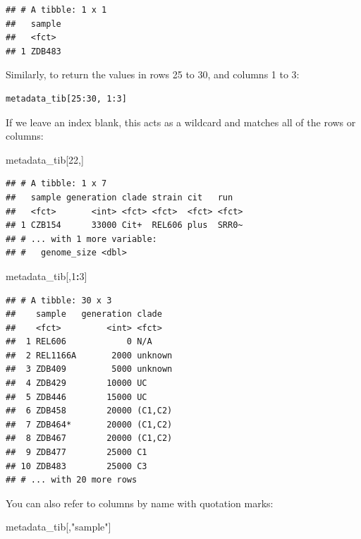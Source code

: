 \documentclass[]{book}
\newenvironment{Shaded}{\begin{snugshade}}{\end{snugshade}}
\newcommand{\DecValTok}[1]{\textcolor[rgb]{0.00,0.00,0.81}{#1}}
\newcommand{\NormalTok}[1]{#1}
\newcommand{\OperatorTok}[1]{\textcolor[rgb]{0.81,0.36,0.00}{\textbf{#1}}}
\newcommand{\StringTok}[1]{\textcolor[rgb]{0.31,0.60,0.02}{#1}}
\begin{document}
\begin{verbatim}
## # A tibble: 1 x 1
##   sample
##   <fct> 
## 1 ZDB483
\end{verbatim}

Similarly, to return the values in rows 25 to 30, and columns 1 to 3:

\begin{verbatim}
metadata_tib[25:30, 1:3]
\end{verbatim}

If we leave an index blank, this acts as a wildcard and matches all of the rows or columns:

\begin{Shaded}
\begin{Highlighting}[]
\NormalTok{metadata_tib[}\DecValTok{22}\NormalTok{,]}
\end{Highlighting}
\end{Shaded}

\begin{verbatim}
## # A tibble: 1 x 7
##   sample generation clade strain cit   run  
##   <fct>       <int> <fct> <fct>  <fct> <fct>
## 1 CZB154      33000 Cit+  REL606 plus  SRR0~
## # ... with 1 more variable:
## #   genome_size <dbl>
\end{verbatim}

\begin{Shaded}
\begin{Highlighting}[]
\NormalTok{metadata_tib[,}\DecValTok{1}\OperatorTok{:}\DecValTok{3}\NormalTok{]}
\end{Highlighting}
\end{Shaded}

\begin{verbatim}
## # A tibble: 30 x 3
##    sample   generation clade  
##    <fct>         <int> <fct>  
##  1 REL606            0 N/A    
##  2 REL1166A       2000 unknown
##  3 ZDB409         5000 unknown
##  4 ZDB429        10000 UC     
##  5 ZDB446        15000 UC     
##  6 ZDB458        20000 (C1,C2)
##  7 ZDB464*       20000 (C1,C2)
##  8 ZDB467        20000 (C1,C2)
##  9 ZDB477        25000 C1     
## 10 ZDB483        25000 C3     
## # ... with 20 more rows
\end{verbatim}

You can also refer to columns by name with quotation marks:

\begin{Shaded}
\begin{Highlighting}[]
\NormalTok{metadata_tib[,}\StringTok{"sample"}\NormalTok{]}
\end{Highlighting}
\end{Shaded}
\end{document}
